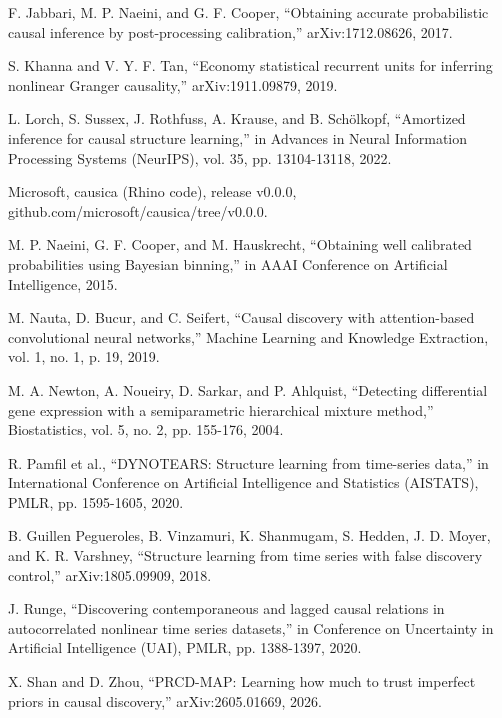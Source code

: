 \documentclass[10pt]{article}
\begin{document}
\hangindent=0.2in\noindent F. Jabbari, M. P. Naeini, and G. F. Cooper, ``Obtaining accurate probabilistic causal inference by post-processing calibration,'' arXiv:1712.08626, 2017.\par
\hangindent=0.2in\noindent S. Khanna and V. Y. F. Tan, ``Economy statistical recurrent units for inferring nonlinear Granger causality,'' arXiv:1911.09879, 2019.\par
\hangindent=0.2in\noindent L. Lorch, S. Sussex, J. Rothfuss, A. Krause, and B. Schölkopf, ``Amortized inference for causal structure learning,'' in Advances in Neural Information Processing Systems (NeurIPS), vol. 35, pp. 13104-13118, 2022.\par
\hangindent=0.2in\noindent Microsoft, causica (Rhino code), release v0.0.0, github.com/microsoft/causica/tree/v0.0.0.\par
\hangindent=0.2in\noindent M. P. Naeini, G. F. Cooper, and M. Hauskrecht, ``Obtaining well calibrated probabilities using Bayesian binning,'' in AAAI Conference on Artificial Intelligence, 2015.\par
\hangindent=0.2in\noindent M. Nauta, D. Bucur, and C. Seifert, ``Causal discovery with attention-based convolutional neural networks,'' Machine Learning and Knowledge Extraction, vol. 1, no. 1, p. 19, 2019.\par
\hangindent=0.2in\noindent M. A. Newton, A. Noueiry, D. Sarkar, and P. Ahlquist, ``Detecting differential gene expression with a semiparametric hierarchical mixture method,'' Biostatistics, vol. 5, no. 2, pp. 155-176, 2004.\par
\hangindent=0.2in\noindent R. Pamfil et al., ``DYNOTEARS: Structure learning from time-series data,'' in International Conference on Artificial Intelligence and Statistics (AISTATS), PMLR, pp. 1595-1605, 2020.\par
\hangindent=0.2in\noindent B. Guillen Pegueroles, B. Vinzamuri, K. Shanmugam, S. Hedden, J. D. Moyer, and K. R. Varshney, ``Structure learning from time series with false discovery control,'' arXiv:1805.09909, 2018.\par
\hangindent=0.2in\noindent J. Runge, ``Discovering contemporaneous and lagged causal relations in autocorrelated nonlinear time series datasets,'' in Conference on Uncertainty in Artificial Intelligence (UAI), PMLR, pp. 1388-1397, 2020.\par
\hangindent=0.2in\noindent X. Shan and D. Zhou, ``PRCD-MAP: Learning how much to trust imperfect priors in causal discovery,'' arXiv:2605.01669, 2026.\par
\end{document}
